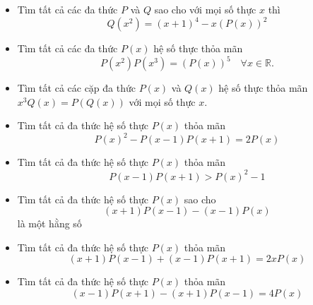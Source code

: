 \documentclass[11pt]{scrartcl}
\begin{document}
\begin{itemize}[label=, leftmargin=0em, itemsep=0.5em]
        \item \begin{btvn}
            Tìm tất cả các đa thức $P$ và $Q$ sao cho với mọi số thực $x$ thì 
                $$
                Q\left(x^2\right)=(x+1)^4-x(P(x))^2
                $$
        \end{btvn}

        \item \begin{btvn}
        Tìm tất cả các đa thức $P(x)$ hệ số thực thỏa mãn
            $$
            P\left(x^2\right) P\left(x^3\right)=(P(x))^5 \quad \forall x \in \mathbb{R} .
            $$
        \end{btvn}

        \item \begin{btvn}
            Tìm tất cả các cặp đa thức $P(x)$ và $Q(x)$ hệ số thực thỏa mãn $x^3 Q(x)=P(Q(x))$ với mọi số thực $x$.
        \end{btvn}

        \item \begin{btvn}
            Tìm tất cả đa thức hệ số thực $P(x)$ thỏa mãn
            $$
            P(x)^2-P(x-1) P(x+1)=2 P(x)
            $$
        \end{btvn}

        \item \begin{btvn}
            Tìm tất cả đa thức hệ số thực $P(x)$ thỏa mãn
            $$
            P(x-1) P(x+1)>P(x)^2-1
            $$
        \end{btvn}

        \item \begin{btvn}
            Tìm tất cả đa thức hệ số thực $P(x)$ sao cho
            $$
            (x+1) P(x-1)-(x-1) P(x)
            $$
            là một hằng số
        \end{btvn}

        \item \begin{btvn}
            Tìm tất cả đa thức hệ số thực $P(x)$ thỏa mãn
            $$
            (x+1) P(x-1)+(x-1) P(x+1)=2 x P(x) 
            $$
        \end{btvn}

        \item \begin{btvn}
        Tìm tất cả đa thức hệ số thực $P(x)$ thỏa mãn
            $$
            (x-1) P(x+1)-(x+1) P(x-1)=4 P(x)
            $$
        \end{btvn}


\end{itemize}
\end{document}
